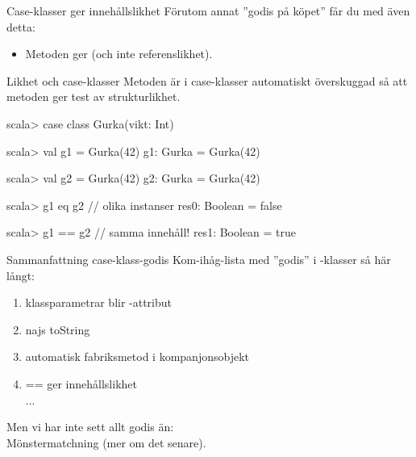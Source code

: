 

\begin{Slide}{Case-klasser ger innehållslikhet}
Förutom annat ''godis på köpet'' får du med  även detta:
\begin{itemize}
\item Metoden \code{==} ger  (och inte referenslikhet).
\end{itemize}
\end{Slide}



\begin{Slide}{Likhet och case-klasser}
Metoden  är i case-klasser automatiskt överskuggad så att metoden \code{==} ger test av strukturlikhet.
\begin{REPL}
scala> case class Gurka(vikt: Int)

scala> val g1 = Gurka(42)
g1: Gurka = Gurka(42)

scala> val g2 = Gurka(42)
g2: Gurka = Gurka(42)

scala> g1 eq g2          // olika instanser
res0: Boolean = false

scala> g1 == g2          // samma innehåll!
res1: Boolean = true
\end{REPL}
\end{Slide}



\begin{Slide}{Sammanfattning case-klass-godis}
Kom-ihåg-lista med ''godis'' i -klasser så här långt:
\begin{enumerate}
\item klassparametrar blir -attribut
\item najs toString
\item automatisk fabriksmetod  i kompanjonsobjekt
\item == ger innehållslikhet 
\pause~\\...
\end{enumerate}

\vspace{1em}Men vi har inte sett allt godis än: \\Mönstermatchning (mer om det senare).
\end{Slide}
